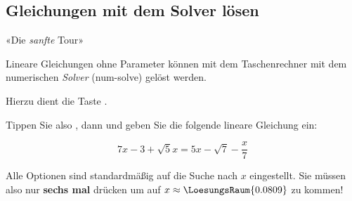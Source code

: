 
\subsection{Gleichungen mit dem Solver lösen}

«Die \textit{sanfte} Tour»

Lineare Gleichungen ohne Parameter können mit dem Taschenrechner mit dem numerischen
\textit{Solver} (num-solve) gelöst werden.

  Hierzu dient die Taste .

  Tippen Sie also , dann  und geben
  Sie die folgende lineare Gleichung ein:

  $$7x - 3 + \sqrt{5}x = 5x - \sqrt{7} - \frac{x}7$$


  Alle Optionen sind standardmäßig auf die Suche nach $x$
  eingestellt. Sie müssen also nur \textbf{sechs mal} 
  drücken um auf $x\approx \LoesungsRaum{0.0809}$ zu kommen!
  \newpage

  
